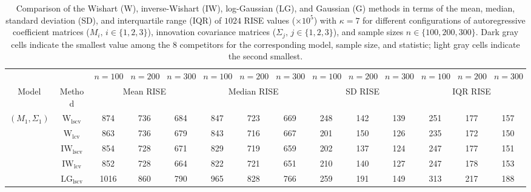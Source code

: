 \begin{table}[!ht]
\caption{Comparison of the Wishart (W), inverse-Wishart (IW), log-Gaussian (LG), and Gaussian (G) methods in terms of the mean, median, standard deviation (SD), and interquartile range (IQR) of $1024$ RISE values ($\times 10^5$) with $\kappa = 7$ for different configurations of autoregressive coefficient matrices ($M_i, \, i\in \{1,2,3\}$), innovation covariance matrices ($\Sigma_j, \, j\in \{1,2,3\}$), and sample sizes $n \in \{100, 200, 300\}$. Dark gray cells indicate the smallest value among the 8 competitors for the corresponding model, sample size, and statistic; light gray cells indicate the second smallest.}
\label{tab:summary}

\fontsize{7.9}{7}\selectfont\renewcommand{\arraystretch}{0}
\setlength{\tabcolsep}{1.2pt}
\setlength{\aboverulesep}{0.35ex}
\setlength{\belowrulesep}{0.35ex}
\centering
{
\begin{tabular}{@{}cc|ccc|ccc|ccc|ccc@{}}
\toprule
\multicolumn{2}{c|}{} & $n = 100$ & $n = 200$ & $n = 300$ & $n = 100$ & $n = 200$ & $n = 300$ & $n = 100$ & $n = 200$ & $n = 300$ & $n = 100$ & $n = 200$ & $n = 300$ \\
\cmidrule(r){1-2}\cmidrule(lr){3-5}\cmidrule(lr){6-8}\cmidrule(lr){9-11}\cmidrule(l){12-14}
Model & Method & \multicolumn{3}{c|}{Mean RISE} & \multicolumn{3}{c|}{Median RISE} & \multicolumn{3}{c|}{SD RISE} & \multicolumn{3}{c}{IQR RISE} \\
\midrule
$(M_1,\Sigma_1)$ & $\mathrm{W}_{\mathrm{lscv}}$ & 874 & 736 & 684 & 847 & 723 & 669 & 248 & 142 & 139 & 251 & 177 & 157 \\ 
 & $\mathrm{W}_{\mathrm{lcv}}$ & 863 & 736 & 679 & 843 & \cellcolor{black!30}716 & 667 & 201 & 150 & \cellcolor{black!10}126 & \cellcolor{black!10}235 & \cellcolor{black!10}172 & 150 \\ 
 & $\mathrm{IW}_{\mathrm{lscv}}$ & \cellcolor{black!10}854 & \cellcolor{black!10}728 & \cellcolor{black!10}671 & \cellcolor{black!10}829 & \cellcolor{black!10}719 & \cellcolor{black!10}659 & 202 & \cellcolor{black!30}137 & \cellcolor{black!30}124 & 247 & 177 & 151 \\ 
 & $\mathrm{IW}_{\mathrm{lcv}}$ & \cellcolor{black!30}852 & \cellcolor{black!30}728 & \cellcolor{black!30}664 & \cellcolor{black!30}822 & 721 & \cellcolor{black!30}651 & 210 & \cellcolor{black!10}140 & 127 & 247 & 178 & 153 \\ 
 & $\mathrm{LG}_{\mathrm{lscv}}$ & 1016 & 860 & 790 & 965 & 828 & 766 & 259 & 191 & 149 & 313 & 217 & 188 \\ 

\end{tabular}}
\end{table}
